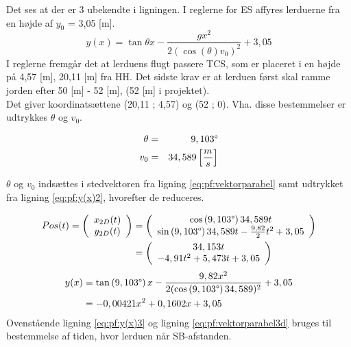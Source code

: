 Det ses at der er 3 ubekendte i ligningen. I reglerne for ES affyres lerduerne fra en højde af \(y_0\) = 3,05 [m].
\begin{equation}
y(x) = \tan \theta x - \frac{gx^2}{2(\cos \left( \theta \right)  v_0)^2} + 3,05
\label{eq:pf:y(x)2}
\end{equation}
I reglerne fremgår det at lerduens flugt passere TCS, som er placeret i en højde på 4,57 [m], 20,11 [m] fra HH. Det sidste krav er at lerduen først skal ramme jorden efter 50 [m] - 52 [m], (52 [m] i projektet). \\
Det giver koordinatsættene (20,11 ; 4,57) og (52 ; 0). Vha. disse bestemmelser er udtrykkes \(\theta\) og \(v_0\).

\begin{eqnarray}
\theta &=& 9,103\degree \\
v_0 &=& 34,589 \left[ \frac { m }{ s }  \right] 
\end{eqnarray}

 \(\theta\) og \(v_0\) indsættes i stedvektoren fra ligning \ref{eq:pf:vektorparabel} samt udtrykket fra ligning \ref{eq:pf:y(x)2}, hvorefter de reduceres.

\begin{align}
\begin{split}
	Pos(t) = \left( \begin{array}{c}
	x_{2D}(t) \\
	y_{2D}(t)
	\end{array}
	\right)
	&= \left( \begin{array}{c}
	\cos \left(9,103\degree \right) 34,589 t \\
	\sin \left(9,103\degree \right) 34,589 t - \frac{9,82}{2} t^2 + 3,05
	\end{array}
	\right) \\
	&= \left( \begin{array}{c}
	34,153 t \\
	- 4,91 t^2 + 5,473 t + 3,05
	\end{array}
	\right)
\label{eq:pf:vektorparabel2}
\end{split}
\end{align}
\begin{align}
\begin{split}
y(x) &= \tan \left(9,103\degree \right) x - \frac{9,82x^2}{2(\cos \left(9,103\degree \right) 34,589)^2} + 3,05 \\
&= - 0,00421 x^2 + 0,1602 x  + 3,05
\label{eq:pf:y(x)3}
\end{split}
\end{align}
Ovenstående ligning \ref{eq:pf:y(x)3} og ligning \ref{eq:pf:vektorparabel3d} bruges til bestemmelse af tiden, hvor lerduen når SB-afstanden.

